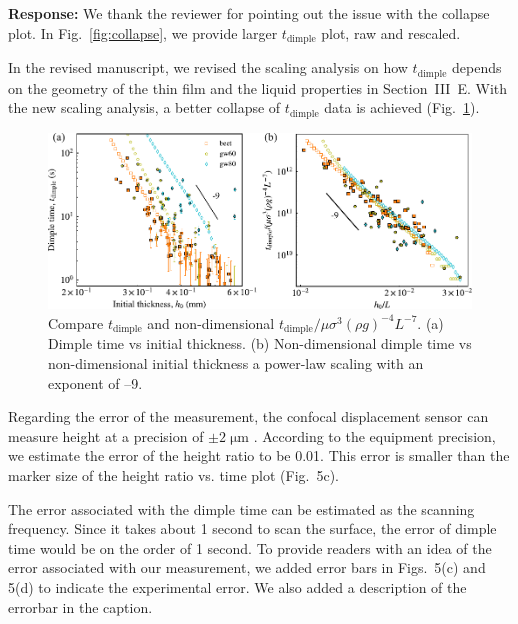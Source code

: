 \documentclass[11pt]{article}
\newif\ifhighlight
\newcommand{\hl}[1]{\ifhighlight\textcolor{blue}{#1}\else#1\fi}
\begin{document}
\textbf{Response:} We thank the reviewer for pointing out the issue with the collapse plot. 
In Fig.~\ref{fig:collapse}, we provide larger $t_\mathrm{dimple}$ plot, raw and rescaled. 


\hl{
In the revised manuscript, we revised the scaling analysis on how $t_\mathrm{dimple}$ depends on the geometry of the thin film and the liquid properties in Section~III~E. 
With the new scaling analysis, a better collapse of $t_\mathrm{dimple}$ data is achieved (Fig.~\ref{fig:good_collapse}). 
}

\begin{figure}[h]
    \centering
    \includegraphics[width=0.8\linewidth]{good_collapse}
    \caption{Compare $t_\mathrm{dimple}$ and non-dimensional $t_\mathrm{dimple}/{\mu \sigma^3 (\rho g)^{-4} L^{-7}}$. (a) Dimple time vs initial thickness. (b) Non-dimensional dimple time vs non-dimensional initial thickness a power-law scaling with an exponent of –9. }
    \label{fig:good_collapse}
\end{figure}

Regarding the error of the measurement, the confocal displacement sensor can measure height at a precision of $\pm 2\;\mathrm{\mu m}$ . According to the equipment precision, we estimate the error of the height ratio to be 0.01. This error is smaller than the marker size of the height ratio vs. time plot (Fig.~5c).

The error associated with the dimple time can be estimated as the scanning frequency. Since it takes about 1 second to scan the surface, the error of dimple time would be on the order of 1 second. To provide readers with an idea of the error associated with our measurement, we added error bars in Figs.~5(c) and 5(d) to indicate the experimental error. We also added a description of the errorbar in the caption.
\end{document}
